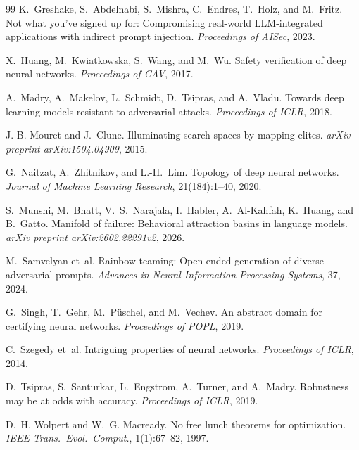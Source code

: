 \documentclass[11pt]{article}
\begin{document}
\begin{thebibliography}{99}
K.~Greshake, S.~Abdelnabi, S.~Mishra, C.~Endres, T.~Holz, and M.~Fritz.
\newblock Not what you've signed up for: Compromising real-world
  {LLM}-integrated applications with indirect prompt injection.
\newblock \emph{Proceedings of AISec}, 2023.

X.~Huang, M.~Kwiatkowska, S.~Wang, and M.~Wu.
\newblock Safety verification of deep neural networks.
\newblock \emph{Proceedings of CAV}, 2017.

A.~Madry, A.~Makelov, L.~Schmidt, D.~Tsipras, and A.~Vladu.
\newblock Towards deep learning models resistant to adversarial attacks.
\newblock \emph{Proceedings of ICLR}, 2018.

J.-B. Mouret and J.~Clune.
\newblock Illuminating search spaces by mapping elites.
\newblock \emph{arXiv preprint arXiv:1504.04909}, 2015.

G.~Naitzat, A.~Zhitnikov, and L.-H.~Lim.
\newblock Topology of deep neural networks.
\newblock \emph{Journal of Machine Learning Research}, 21(184):1--40, 2020.

S.~Munshi, M.~Bhatt, V.~S.~Narajala, I.~Habler, A.~Al-Kahfah,
K.~Huang, and B.~Gatto.
\newblock Manifold of failure: Behavioral attraction basins in language
  models.
\newblock \emph{arXiv preprint arXiv:2602.22291v2}, 2026.

M.~Samvelyan et~al.
\newblock Rainbow teaming: Open-ended generation of diverse adversarial
  prompts.
\newblock \emph{Advances in Neural Information Processing Systems}, 37,
2024.

G.~Singh, T.~Gehr, M.~P{\"u}schel, and M.~Vechev.
\newblock An abstract domain for certifying neural networks.
\newblock \emph{Proceedings of POPL}, 2019.

C.~Szegedy et~al.
\newblock Intriguing properties of neural networks.
\newblock \emph{Proceedings of ICLR}, 2014.

D.~Tsipras, S.~Santurkar, L.~Engstrom, A.~Turner, and A.~Madry.
\newblock Robustness may be at odds with accuracy.
\newblock \emph{Proceedings of ICLR}, 2019.

D.~H. Wolpert and W.~G. Macready.
\newblock No free lunch theorems for optimization.
\newblock \emph{IEEE Trans.\ Evol.\ Comput.}, 1(1):67--82, 1997.


\end{thebibliography}
\end{document}
